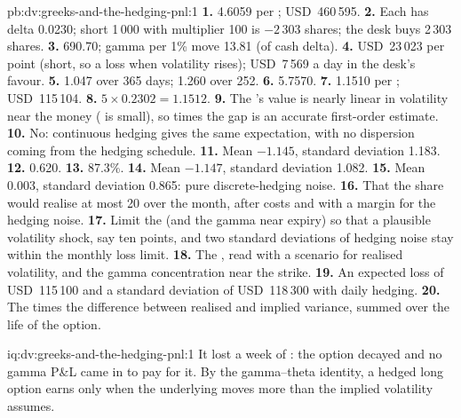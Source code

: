\begin{solution}{pb:dv:greeks-and-the-hedging-pnl:1}
\textbf{1.} 4.6059 per ; USD~460\,595.
\textbf{2.} Each  has delta 0.0230; short 1\,000 with multiplier 100 is $-2\,303$
shares; the desk buys 2\,303 shares.
\textbf{3.}  690.70; gamma per 1\% move 13.81 (of cash delta).
\textbf{4.}  USD~23\,023 per point (short, so a loss when volatility rises); 
USD~7\,569 a day in the desk's favour.
\textbf{5.} 1.047 over 365 days; 1.260 over 252.
\textbf{6.} 5.7570.
\textbf{7.} 1.1510 per ; USD~115\,104.
\textbf{8.} $5\times0.2302=1.1512$.
\textbf{9.} The 's value is nearly linear in volatility near the money ( is
small), so  times the gap is an accurate first-order estimate.
\textbf{10.} No: continuous hedging gives the same expectation, with no dispersion
coming from the hedging schedule.
\textbf{11.} Mean $-1.145$, standard deviation 1.183.
\textbf{12.} 0.620.
\textbf{13.} 87.3\%.
\textbf{14.} Mean $-1.147$, standard deviation 1.082.
\textbf{15.} Mean 0.003, standard deviation 0.865: pure discrete-hedging noise.
\textbf{16.} That the share would realise at most 20 over the month, after costs and
with a margin for the hedging noise.
\textbf{17.} Limit the  (and the gamma near expiry) so that a plausible volatility
shock, say ten points, and two standard deviations of hedging noise stay within the
monthly loss limit.
\textbf{18.} The , read with a scenario for realised volatility, and the gamma
concentration near the strike.
\textbf{19.} An expected loss of USD~115\,100 and a standard deviation of USD~118\,300
with daily hedging.
\textbf{20.} The  times the difference between realised and implied variance,
summed over the life of the option.
\end{solution}

\begin{solution}{iq:dv:greeks-and-the-hedging-pnl:1}
It lost a week of : the option decayed and no gamma P\&L came in to pay for it.
By the gamma--theta identity, a hedged long option earns only when the underlying moves
more than the implied volatility assumes.
\end{solution}

